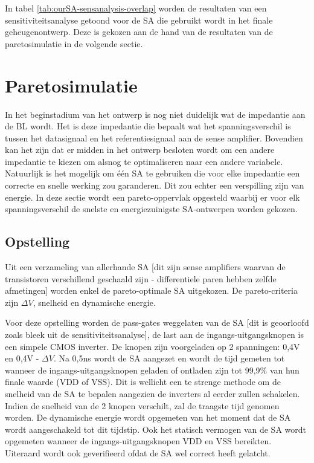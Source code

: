 In tabel \ref{tab:ourSA-sensanalysis-overlap} worden de resultaten van een sensitiviteitsanalyse getoond voor de SA die gebruikt wordt in het finale geheugenontwerp. Deze is gekozen aan de hand van de resultaten van de paretosimulatie in de volgende sectie.


\section{Paretosimulatie}
In het beginstadium van het ontwerp is nog niet duidelijk wat de impedantie aan de BL wordt. Het is deze impedantie die bepaalt wat het spanningsverschil is tussen het datasignaal en het referentiesignaal aan de sense amplifier. Bovendien kan het zijn dat er midden in het ontwerp besloten wordt om een andere impedantie te kiezen om alsnog te optimaliseren naar een andere variabele.
Natuurlijk is het mogelijk om één SA te gebruiken die voor elke impedantie een correcte en snelle werking zou garanderen. Dit zou echter een verspilling zijn van energie. In deze sectie wordt een pareto-oppervlak opgesteld waarbij er voor elk spanningsverschil de snelste en energiezuinigste SA-ontwerpen worden gekozen.

\subsection{Opstelling}
Uit een verzameling van allerhande SA [dit zijn sense amplifiers waarvan de transistoren verschillend geschaald zijn - differentiele paren hebben zelfde afmetingen] worden enkel de pareto-optimale SA uitgekozen. De pareto-criteria zijn $\Delta V$, snelheid en dynamische energie. 

Voor deze opstelling worden de pass-gates weggelaten van de SA [dit is geoorloofd zoals bleek uit de sensitiviteitsanalyse], de last aan de ingangs-uitgangsknopen is een simpele CMOS inverter. De knopen zijn voorgeladen op 2 spanningen: 0,4V en 0,4V - $\Delta V$. Na 0,5ns wordt de SA aangezet en wordt de tijd gemeten tot wanneer de ingangs-uitgangsknopen geladen of ontladen zijn tot 99,9\% van hun finale waarde (VDD of VSS). Dit is wellicht een te strenge methode om de snelheid van de SA te bepalen aangezien de inverters al eerder zullen schakelen. Indien de snelheid van de 2 knopen verschilt, zal de traagste tijd genomen worden. De dynamische energie wordt opgemeten van het moment dat de SA wordt aangeschakeld tot dit tijdstip. Ook het statisch vermogen van de SA wordt opgemeten wanneer de ingangs-uitgangsknopen VDD en VSS bereikten. Uiteraard wordt ook geverifieerd ofdat de SA wel correct heeft gelatcht.

